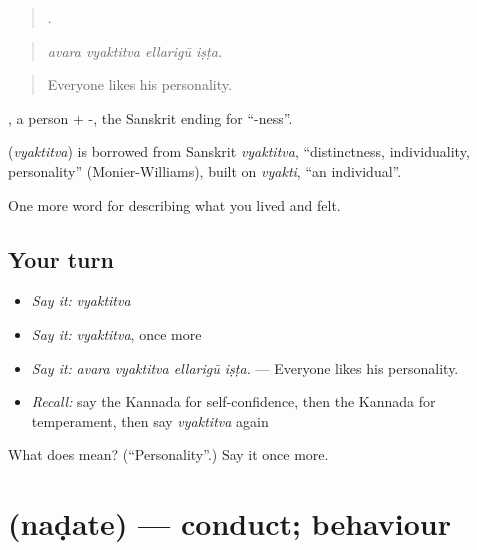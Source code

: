 \begin{quote}
   .
\end{quote}

\begin{quote}
\emph{avara vyaktitva ellarigū iṣṭa.}
\end{quote}

\begin{quote}
Everyone likes his personality.
\end{quote}

, a person + -, the Sanskrit ending for \textquotedblleft{}-ness\textquotedblright{}.

\begin{cousinweb}
\textbf{} (\emph{vyaktitva}) is borrowed from Sanskrit \emph{vyaktitva}, \textquotedblleft{}distinctness, individuality, personality\textquotedblright{} (Monier-Williams), built on \emph{vyakti}, \textquotedblleft{}an individual\textquotedblright{}.
\end{cousinweb}

\begin{grammarlens}[title={What you've built}]
One more word for describing what you lived and felt.
\end{grammarlens}

\subsection*{Your turn}
\begin{itemize}
\raggedright
  \item \emph{Say it:} \emph{vyaktitva}
  \item \emph{Say it:} \emph{vyaktitva}, once more
  \item \emph{Say it:} \emph{avara vyaktitva ellarigū iṣṭa.} — Everyone likes his personality.
  \item \emph{Recall:} say the Kannada for self-confidence, then the Kannada for temperament, then say \emph{vyaktitva} again
\end{itemize}

\begin{tcolorbox}[breakable,colback=teal!4,colframe=teal!35!black,title={Before you move on}]
What does  mean? (\textquotedblleft{}Personality\textquotedblright{}.) Say it once more.
\end{tcolorbox}
\section[\texorpdfstring{\kn{ನಡತೆ} (naḍate)}{ನಡತೆ (naḍate)}]{ (naḍate) — conduct; behaviour}

